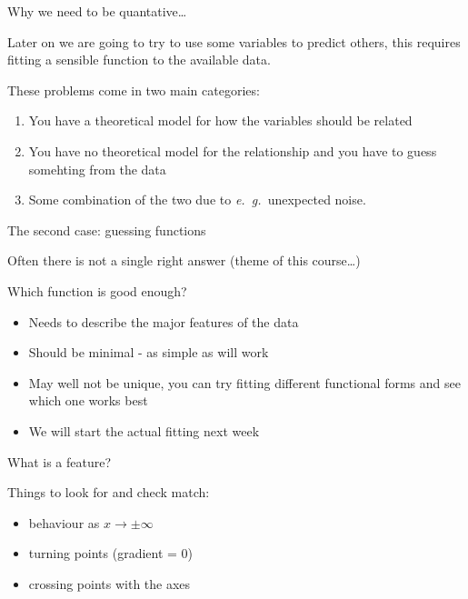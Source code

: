 \documentclass{beamer}
\begin{document}
\begin{frame}{Why we need to be quantative\ldots}

Later on we are going to try to use some variables to predict others, this requires fitting a sensible function to the available data.

\vspace{5mm}

These problems come in two main categories:
\begin{enumerate}
\item You have a theoretical model for how the variables should be related
\item You have no theoretical model for the relationship and you have to guess somehting from the data
\item Some combination of the two due to \textit{e.~g.~}unexpected noise.
\end{enumerate}

\end{frame}



\begin{frame}{The second case: guessing functions}

Often there is not a single right answer (theme of this course\ldots)

\vspace{5mm}

Which function is good enough?
\begin{itemize}
\item Needs to describe the major features of the data
\item Should be minimal - as simple as will work
\item May well not be unique, you can try fitting different functional forms and see which one works best
\item We will start the actual fitting next week
\end{itemize}


\end{frame}


\begin{frame}{What is a feature?}


Things to look for and check match:
\begin{itemize}
\item behaviour as $x \rightarrow \pm \infty$
\item turning points (gradient = 0)
\item crossing points with the axes
\end{itemize}

\end{frame}
\end{document}
